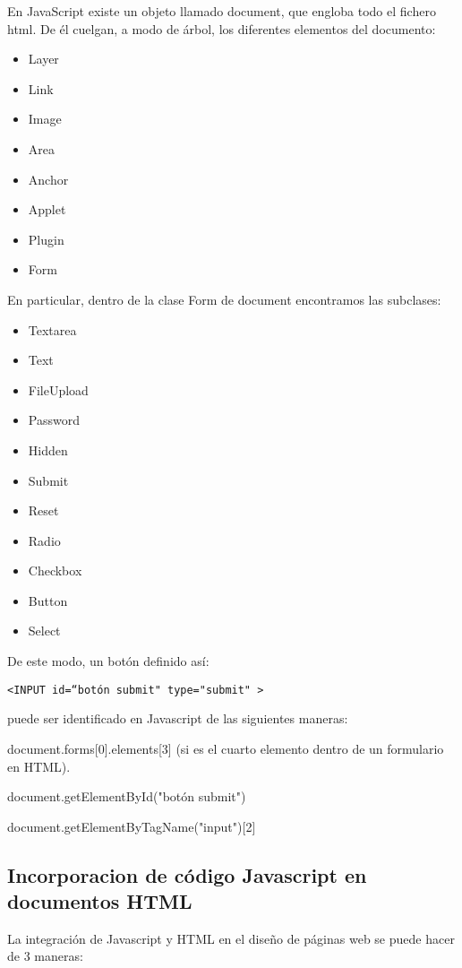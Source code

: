 \documentclass{apuntes}
\begin{document}
\begin{enumerate}
En JavaScript existe un objeto llamado document, que engloba todo el fichero html. De él cuelgan, a modo de árbol, los diferentes elementos del documento:
\begin {itemize}
\item Layer
\item Link
\item Image
\item Area
\item Anchor
\item Applet
\item Plugin
\item Form
\end{itemize}
En particular, dentro de la clase Form de document encontramos las subclases:

\begin{itemize}
\item Textarea
\item Text
\item FileUpload
\item Password
\item Hidden
\item Submit
\item Reset
\item Radio
\item Checkbox
\item Button
\item Select
\end{itemize}

De este modo, un botón definido así:

\begin{verbatim}
<INPUT id=“botón submit" type="submit" >
\end{verbatim}
puede ser identificado en Javascript de las siguientes maneras:

document.forms[0].elements[3] (si es el cuarto elemento dentro de un formulario en HTML).

document.getElementById("botón submit")

document.getElementByTagName("input")[2]



\end{enumerate}

\subsection{Incorporacion de código Javascript en documentos HTML}

La integración de Javascript y HTML en el diseño de páginas web se puede hacer de 3 maneras:
\end{document}
